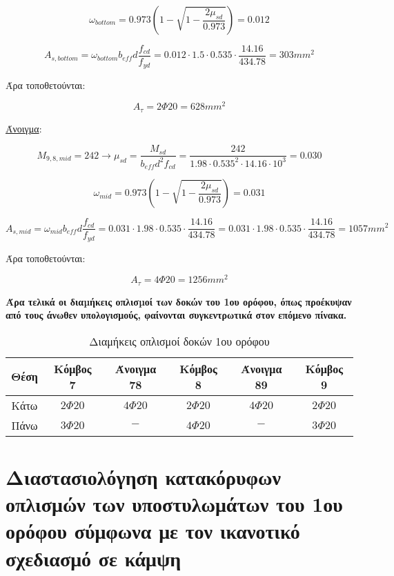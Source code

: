 \[
\omega_{bottom} = 0.973\left( 1 - \sqrt{1 - \dfrac{2\mu_{sd}}{0.973}} \right) = 0.012
\]

\[
A_{s,bottom} = \omega_{bottom}b_{eff} d \dfrac{f_{cd}}{f_{yd}} = 0.012\cdot 1.5 \cdot 0.535 \cdot \dfrac{14.16}{434.78} = 303mm^2
\]

\noindent
Άρα τοποθετούνται:

\[
A_{\tau} = 2\Phi20 = 628mm^2
\]

\noindent
\underline{Άνοιγμα}:

\bigskip

\[
M_{9,8,mid} = 242 \rightarrow \mu_{sd} = \dfrac{M_{sd}}{b_{eff} d^2 f_{cd}} = \dfrac{242}{1.98\cdot0.535^2\cdot14.16\cdot10^3} = 0.030
\]

\[
\omega_{mid} = 0.973\left( 1 - \sqrt{1 - \dfrac{2\mu_{sd}}{0.973}} \right) = 0.031
\]

\[
A_{s,mid} = \omega_{mid}b_{eff} d \dfrac{f_{cd}}{f_{yd}} = 0.031\cdot 1.98 \cdot 0.535 \cdot \dfrac{14.16}{434.78} = 0.031\cdot 1.98 \cdot 0.535 \cdot \dfrac{14.16}{434.78} = 1057 mm^2
\]

\noindent
Άρα τοποθετούνται:

\[
A_{\tau} = 4\Phi20 = 1256 mm^2
\]

\bigskip

\noindent\textbf{\textcolor{mygreen}{Άρα τελικά οι διαµήκεις οπλισµοί των δοκών του 1ου ορόφου, όπως προέκυψαν από τους άνωθεν υπολογισμούς, φαίνονται συγκεντρωτικά στον επόμενο πίνακα.}}

\bigskip

\begin{table}[h]
\centering\footnotesize
\begin{tabular}{| c || c | c | c | c | c |}
\hline
Θέση & Κόμβος 7 & Άνοιγμα 78 & Κόμβος 8 & Άνοιγμα 89 & Κόμβος 9 \\
\hline
\hline
Κάτω & $2\Phi20$ & $4\Phi20$ & $2\Phi20$ & $4\Phi20$ & $2\Phi20$ \\
\hline
Πάνω & $3\Phi20$ & $-$ & $4\Phi20$ & $-$ & $3\Phi20$ \\
\hline
\end{tabular}
\caption{Διαμήκεις οπλισμοί δοκών 1ου ορόφου}
\label{tab:beamrebar}
\end{table}

\section{Διαστασιολόγηση κατακόρυφων οπλισμών των υποστυλωμάτων του 1ου ορόφου σύμφωνα με τον ικανοτικό σχεδιασμό σε κάμψη}

